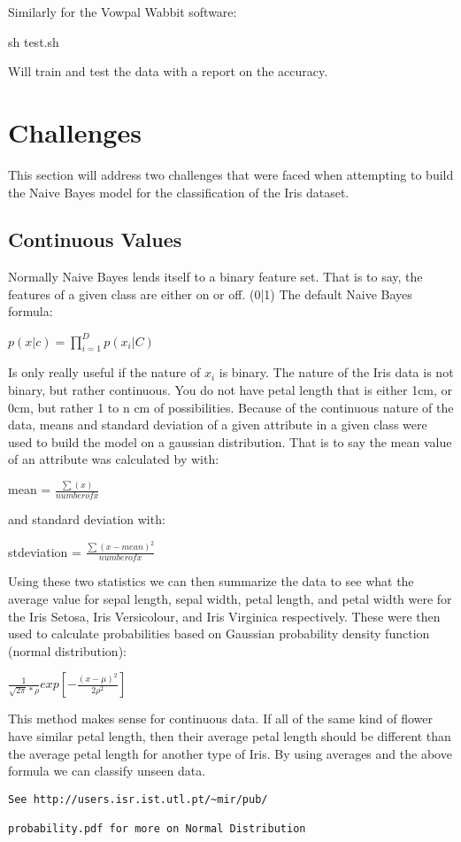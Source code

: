 \documentclass{article}
\begin{document}
 Similarly for the Vowpal Wabbit software:
 
 sh test.sh
 
 Will train and test the data with a report on the accuracy. 
 
\section{Challenges}
This section will address two challenges that were faced when attempting to build the Naive Bayes model for the classification of the Iris dataset. 

\subsection{Continuous Values}
Normally Naive Bayes lends itself to a binary feature set. That is to say, the features of a given class are either on or off. (0|1) The default Naive Bayes formula:

 $p(x|c) = \prod_{i=1}^{D}p(x_i|C)$

Is only really useful if the nature of $x_i$ is binary. 
The nature of the Iris data is not binary, but rather continuous. You do not have petal length that is either 1cm, or 0cm, but rather 1 to n cm of possibilities. Because of the continuous nature of the data, means and standard deviation of a given attribute in a given class were used to build the model on a gaussian distribution. That is to say the mean value of an attribute was calculated by with:

mean = $\frac{\sum (x)}{number of x}$

and standard deviation with:

stdeviation = $\frac{\sum (x-mean)^2}{number of x}$

Using these two statistics we can then summarize the data to see what the average value for sepal length, sepal width, petal length, and petal width were for the Iris Setosa, Iris Versicolour, and Iris Virginica respectively. These were then used to calculate probabilities based on Gaussian probability density function (normal distribution):

$\frac{1}{\sqrt{2\pi}*\rho} exp [- \frac{(x-\mu)^2}{2\rho^2}]$

This method makes sense for continuous data. If all of the same kind of flower have similar petal length, then their average petal length should be different than the average petal length for another type of Iris. By using averages and the above formula we can classify unseen data. 
{\footnotesize
\begin{verbatim}
See http://users.isr.ist.utl.pt/~mir/pub/

probability.pdf for more on Normal Distribution
\end{verbatim}}
\end{document}
